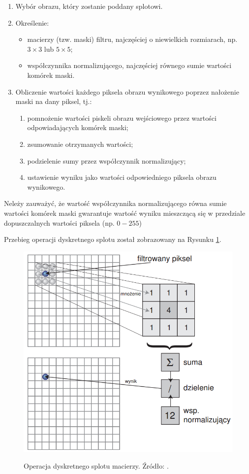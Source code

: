 \documentclass[a4paper,twocolumn,12pt]{article}
\begin{document}
\begin{enumerate}
 \item Wybór obrazu, który zostanie poddany splotowi.
 \item Określenie:
  \begin{itemize}
   \item macierzy (tzw. maski) filtru, najczęściej o niewielkich rozmiarach, np. $3 \times 3$ lub $5 \times 5$;
   \item współczynnika normalizującego, najczęściej równego sumie wartości komórek maski.
  \end{itemize}
 \item Obliczenie wartości każdego piksela obrazu wynikowego poprzez nałożenie maski na dany piksel, tj.:
  \begin{enumerate}
   \item pomnożenie wartości piskeli obrazu wejściowego przez wartości odpowiadających komórek maski;
   \item zsumowanie otrzymanych wartości;
   \item podzielenie sumy przez współczynnik normalizujący;
   \item ustawienie wyniku jako wartości odpowiedniego piksela obrazu wynikowego.
  \end{enumerate}
\end{enumerate}

Neleży zauważyć, że wartość współczynnika normalizującego równa sumie wartości komórek maski gwarantuje wartość wyniku mieszczącą się w przedziale dopuszczalnych wartości piksela (np. $0-255$)

Przebieg operacji dyskretnego splotu został zobrazowany na Rysunku \ref{fig:convolution}.

\begin{figure}[!ht]
 \begin{center}
  \scalebox{0.25}
  {
   \includegraphics{../obrazki/filtry/splot.png}
  }
 \end{center}
 \caption{
  Operacja dyskretnego splotu macierzy.
  Źródło: \cite{stec}.
 }
 \label{fig:convolution}
\end{figure}
\end{document}
